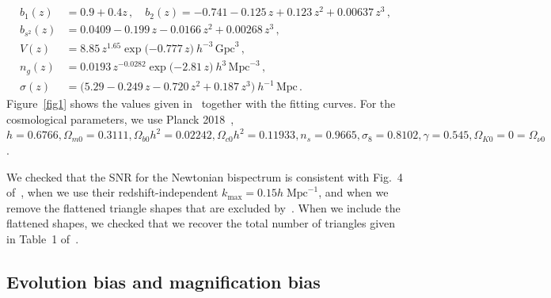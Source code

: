 \begin{align}
b_1(z) &= 0.9+0.4 z\,, \quad b_2(z) = -0.741 - 0.125\,z + 0.123\,z^{2} + 0.00637\,z^{3}\,, \label{e9}  \\
 b_{s^2}(z) &= 0.0409 - 0.199\,z - 0.0166\,z^{2} + 0.00268\,z^{3} \,, \label{e11} \\
 V(z) &= 8.85\, z^{1.65}\exp\big({-0.777\,z}\big)~ h^{-3}\,\mathrm{Gpc}^{3}\,, \label{e11_1} \\
n_{g}(z) &= 0.0193\, z^{-0.0282}\exp\big({-2.81\,z}\big) ~h^{3}\,\mathrm{Mpc}^{-3}\,,
 \label{e11_2}\\
\sigma(z)& = \big(5.29 - 0.249\,z - 0.720\,z^{2} + 0.187\,z^{3}\big)~h^{-1}\,\mathrm{Mpc}\,. \label{e14a}
\end{align}
Figure~\ref{fig1} shows the values given in~\cite{Yankelevich:2018uaz} together with the fitting curves. For the cosmological parameters, we use Planck 2018~\cite{Aghanim:2018eyx},
$h = 0.6766, \Omega_{m0} = 0.3111,
\Omega_{b0}h^{2}= 0.02242,
\Omega_{c0} h^{2} = 0.11933,
n_s = 0.9665,
\sigma_8 = 0.8102, \gamma=0.545,
\Omega_{K0} = 0= \Omega_{\nu 0}$.

We checked that the SNR for the Newtonian bispectrum is consistent with Fig.~4 of~\cite{Yankelevich:2018uaz}, when we use their redshift-independent $k_{\mathrm{max}} = 0.15h\;\mathrm{Mpc}^{-1}$, and when we remove the flattened triangle shapes that are excluded by~\cite{Yankelevich:2018uaz}. When we include the flattened shapes, we checked that we recover the total number of triangles given in Table~1 of~\cite{Oddo:2019run}.
%
%
\subsection{Evolution bias and magnification bias}

